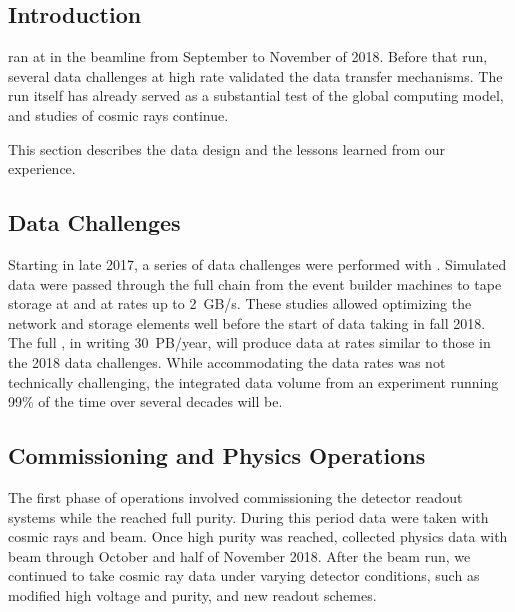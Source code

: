 \subsection{Introduction}
\label{sec:exec-proto-intro}

 ran at  in the  beamline from September to November of 2018. Before that run, several data challenges at high rate validated the data transfer mechanisms. The run itself has already served as a  
substantial test of the global computing model, and studies of cosmic rays continue.

This section describes the  data design and the lessons learned from our experience. %

\subsection{Data Challenges}

Starting in late 2017, a series of data challenges were performed with .  Simulated data were passed through the full chain from the event builder machines to tape storage at  and  at rates up to \SI{2}{GB/s}.  These studies allowed optimizing the network and storage elements well before the start of data taking in fall 2018. 
The full  , in writing \SI{30}{PB/year}, will produce data at rates similar to  those in the 2018 data challenges. While accommodating the  data rates %
was not technically challenging, the integrated data volume from an experiment running 99\% of the time over several decades will be. 

\subsection{Commissioning and Physics Operations}

The first phase of operations involved commissioning the detector readout systems while the  reached full purity.  During this period data were taken with cosmic rays and beam. Once high  purity was reached,  collected physics data with beam through October and half of November 2018. %
After the beam run, we continued to take cosmic ray data under varying detector conditions, such as modified high voltage and purity, and new readout schemes. 


